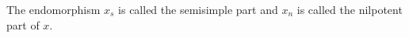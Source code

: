 The endomorphism $x_s$ is called the semisimple part and $x_n$ is called the
nilpotent part of $x$.
